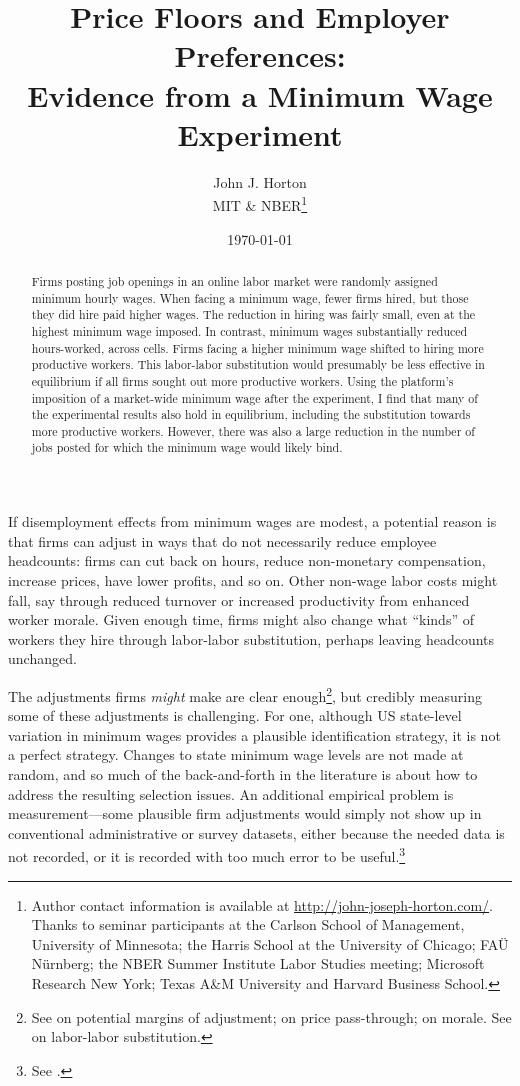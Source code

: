 \documentclass[AER]{AEA}
\title{Price Floors and Employer Preferences: \\ Evidence from a Minimum Wage Experiment}
\author{John J. Horton \\ MIT \& NBER\footnote{Author contact information is available at \href{http://john-joseph-horton.com/}{http://john-joseph-horton.com/}.
    Thanks to seminar participants at the Carlson School of Management, University of Minnesota; the Harris School at the
    University of Chicago; FA\"{U} N\"{u}rnberg; the NBER Summer Institute Labor Studies meeting; Microsoft Research New York; Texas A\&M University and Harvard Business School. 
}}
\begin{document}
\date{\today}
\Keywords{}

\begin{abstract}
\noindent Firms posting job openings in an online labor market were randomly assigned minimum hourly wages.
When facing a minimum wage, fewer firms hired, but those they did hire paid higher wages. 
The reduction in hiring was fairly small, even at the highest minimum wage imposed.  
In contrast, minimum wages substantially reduced hours-worked, across cells.
Firms facing a higher minimum wage shifted to hiring more productive workers.
This labor-labor substitution would presumably be less effective in equilibrium if all firms sought out more productive workers.
Using the platform's imposition of a market-wide minimum wage after the experiment, I find that many of the experimental results also hold in equilibrium, including the substitution towards more productive workers.
However, there was also a large reduction in the number of jobs posted for which the minimum wage would likely bind.
\end{abstract} 

\maketitle


If disemployment effects from minimum wages are modest, a potential reason is that firms can adjust in ways that do not necessarily reduce employee headcounts: 
firms can cut back on hours, reduce non-monetary compensation, increase prices, have lower profits, and so on.
Other non-wage labor costs might fall, say through reduced turnover or increased productivity from enhanced worker morale.
Given enough time, firms might also change what ``kinds'' of workers they hire through labor-labor substitution, perhaps leaving headcounts unchanged.

The adjustments firms \emph{might} make are clear enough\footnote{
  See \cite{schmitt2013does} on potential margins of adjustment; \cite{draca2011minimum} on price pass-through; \cite{hirsch2011minimum} on morale. See \cite{fairris2008, giuliano2009minimum} on labor-labor substitution.
}, but credibly measuring some of these adjustments is challenging. 
For one, although US state-level variation in minimum wages provides a plausible identification strategy, it is not a perfect strategy. 
Changes to state minimum wage levels are not made at random, and so much of the back-and-forth in the literature is about how to address the resulting selection issues.
An additional empirical problem is measurement---some plausible firm adjustments would simply not show up in conventional administrative or survey datasets, either because the needed data is not recorded, or it is recorded with too much error to be useful.\footnote{
  See \cite{card1992using, card1995time, katz1992effect, allegretto2011minimum, dube2010minimum, neumark2013revisiting, clemens2014minimum, powell2016synthetic, meer2013effects}.
}
\end{document}
